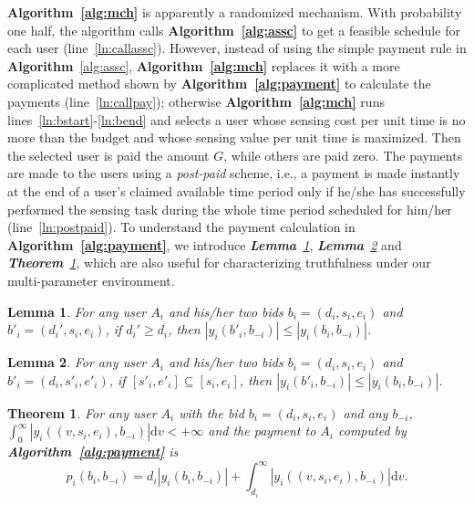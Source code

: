 \documentclass[10pt,journal,compsoc]{IEEEtran}
\newtheorem{theorem}{\textbf{Theorem}}
\newtheorem{lemma}{\textbf{Lemma}}
\begin{document}
  \textbf{Algorithm~\ref{alg:mch}} is apparently a randomized mechanism. With probability one half, the algorithm calls \textbf{Algorithm~\ref{alg:assc}} to get a feasible schedule for each user (line~\ref{ln:callassc}). However, instead of using the simple payment rule in \textbf{Algorithm}~\ref{alg:assc}, \textbf{Algorithm~\ref{alg:mch}} replaces it with a more complicated method shown by \textbf{Algorithm~\ref{alg:payment}} to calculate the payments (line~\ref{ln:callpay}); otherwise \textbf{Algorithm~\ref{alg:mch}} runs lines~\ref{ln:bstart}-\ref{ln:bend} and selects a user whose sensing cost per unit time is no more than the budget and whose sensing value per unit time is maximized. Then the selected user is paid the amount $G$, while others are paid zero. The payments are made to the users using a \textit{post-paid} scheme, i.e., a payment is made instantly at the end of a user's claimed available time period only if he/she has successfully performed the sensing task during the whole time period scheduled for him/her (line~\ref{ln:postpaid}). To understand the payment calculation in \textbf{Algorithm~\ref{alg:payment}}, we introduce \textit{\textbf{Lemma}~\ref{lma:largevalueisless}}, \textit{\textbf{Lemma}~\ref{lma:smallintervalisless}} and \textit{\textbf{Theorem}~\ref{thm:payment}}, which are also useful for characterizing truthfulness under our multi-parameter environment. \begin{lemma}
    For any user $A_i$ and his/her two bids $b_i=(d_i, s_i,e_i)$ and $b'_i=(d_i',s_i,e_i)$, if $d_i'\geq d_i$, then $|y_i(b'_i,b_{-i})|\leq |y_i(b_i,b_{-i})|$.
    \label{lma:largevalueisless}
  \end{lemma}
\begin{lemma}
    For any user $A_i$ and his/her two bids $b_i=(d_i, s_i,e_i)$ and $b'_i=(d_i,s'_i,e'_i)$, if $[s'_i,e'_i]\subseteq [s_i,e_i]$, then $|y_i(b'_i,b_{-i})|\leq |y_i(b_i,b_{-i})|$.
    \label{lma:smallintervalisless}
  \end{lemma}
\begin{theorem}
    For any user $A_i$ with the bid $b_i=(d_i,s_i,e_i)$ and any $b_{-i}$, $\int_0^\infty |y_i\left((v,s_i,e_i),b_{-i}\right)|\mathrm{d}v<+\infty$ and the payment to $A_i$ computed by \textbf{Algorithm~\ref{alg:payment}} is
      \begin{equation}
        p_i(b_i,b_{-i}) = d_i|y_i(b_i,b_{-i})| + \!\int_{d_i}^\infty \!\!|y_i\left((v,s_i,e_i),b_{-i}\right)|\mathrm{d}v.  \label{eqn:payformulation}
      \end{equation}
    \label{thm:payment}
  \end{theorem}
\end{document}
